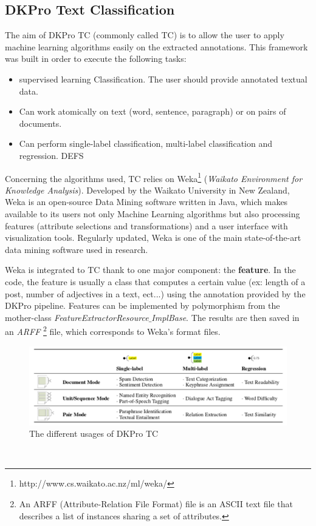 \subsection{DKPro Text Classification}
The aim of DKPro TC (commonly called TC) is to allow the user to apply machine learning algorithms easily on the extracted annotations. This framework was built in order to execute the following tasks:
\begin{itemize}
  \item \Gls{supervised learning} Classification. The user should provide annotated textual data.
  \item Can work atomically on text (word, sentence, paragraph) or on pairs of documents.
  \item Can perform single-label classification, multi-label classification and regression. DEFS
\end{itemize}

Concerning the algorithms used, TC relies on Weka\footnote{http://www.cs.waikato.ac.nz/ml/weka/} (\textit{Waikato Environment for Knowledge Analysis}). Developed by the Waikato University in New Zealand, Weka is an open-source Data Mining software written in Java, which makes available to its users not only Machine Learning algorithms but also processing features (attribute selections and transformations) and a user interface with visualization tools. Regularly updated, Weka is one of the main state-of-the-art data mining software used in research. 
\

Weka is integrated to TC thank to one major component: the \textbf{feature}. In the code, the feature is usually a class that computes a certain value (ex: length of a post, number of adjectives in a text, ect...) using the annotation provided by the DKPro pipeline. Features can be implemented by polymorphism from the mother-class \textit{FeatureExtractorResource$\_$ImplBase}. The results are then saved in an \textit{ARFF} \footnote{An ARFF (Attribute-Relation File Format) file is an ASCII text file that describes a list of instances sharing a set of attributes.} file, which corresponds to Weka's format files.  
\
\begin{figure}[H]
    \centering
    \includegraphics[width=1\textwidth]{fig/TC-modes.png}
    \caption[Short caption]{The different usages of DKPro TC}
    \label{fig:dkpro-tc-usages}
\end{figure}
\

